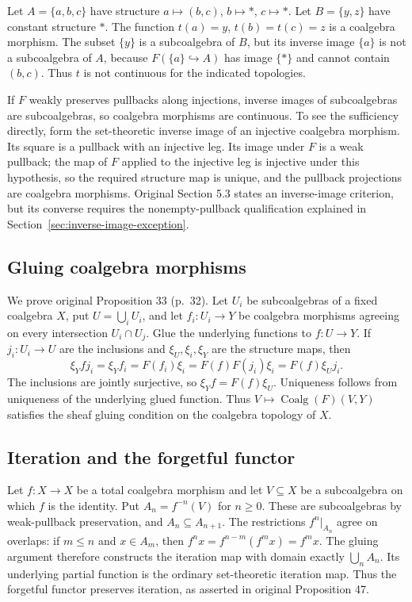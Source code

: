 \documentclass[11pt]{article}
\begin{document}
Let $A=\{a,b,c\}$ have structure $a\mapsto(b,c)$, $b\mapsto*$, $c\mapsto*$. Let $B=\{y,z\}$ have constant structure $*$. The function $t(a)=y$, $t(b)=t(c)=z$ is a coalgebra morphism. The subset $\{y\}$ is a subcoalgebra of $B$, but its inverse image $\{a\}$ is not a subcoalgebra of $A$, because $F(\{a\}\hookrightarrow A)$ has image $\{*\}$ and cannot contain $(b,c)$. Thus $t$ is not continuous for the indicated topologies.

If $F$ weakly preserves pullbacks along injections, inverse images of subcoalgebras are subcoalgebras, so coalgebra morphisms are continuous. To see the sufficiency directly, form the set-theoretic inverse image of an injective coalgebra morphism. Its square is a pullback with an injective leg. Its image under $F$ is a weak pullback; the map of $F$ applied to the injective leg is injective under this hypothesis, so the required structure map is unique, and the pullback projections are coalgebra morphisms. Original Section 5.3 states an inverse-image criterion, but its converse requires the nonempty-pullback qualification explained in Section~\ref{sec:inverse-image-exception}.

\subsection{Gluing coalgebra morphisms}
We prove original Proposition 33 (p.~32). Let $U_i$ be subcoalgebras of a fixed coalgebra $X$, put $U=\bigcup_i U_i$, and let $f_i:U_i\to Y$ be coalgebra morphisms agreeing on every intersection $U_i\cap U_j$. Glue the underlying functions to $f:U\to Y$. If $j_i:U_i\to U$ are the inclusions and $\xi_U,\xi_i,\xi_Y$ are the structure maps, then
\[
\xi_Y f j_i=\xi_Y f_i=F(f_i)\xi_i
 =F(f)F(j_i)\xi_i=F(f)\xi_Uj_i.
\]
The inclusions are jointly surjective, so $\xi_Yf=F(f)\xi_U$. Uniqueness follows from uniqueness of the underlying glued function. Thus $V\mapsto\operatorname{Coalg}(F)(V,Y)$ satisfies the sheaf gluing condition on the coalgebra topology of $X$.

\subsection{Iteration and the forgetful functor}
Let $f:X\to X$ be a total coalgebra morphism and let $V\subseteq X$ be a subcoalgebra on which $f$ is the identity. Put $A_n=f^{-n}(V)$ for $n\geq0$. These are subcoalgebras by weak-pullback preservation, and $A_n\subseteq A_{n+1}$. The restrictions $f^n|_{A_n}$ agree on overlaps: if $m\leq n$ and $x\in A_m$, then $f^nx=f^{n-m}(f^mx)=f^mx$. The gluing argument therefore constructs the iteration map with domain exactly $\bigcup_n A_n$. Its underlying partial function is the ordinary set-theoretic iteration map. Thus the forgetful functor preserves iteration, as asserted in original Proposition 47.
\end{document}

